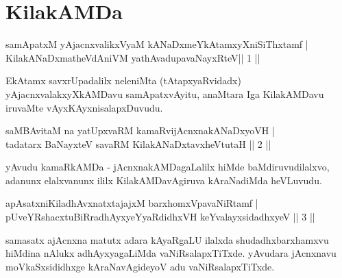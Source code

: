 
\chapter{KilakAMDa}

\begin{shl}
samApatxM yAjacnxvalikxVyaM kANaDxmeYkAtamxyXniSiThxtamf  | \\
KilakANaDxmatheVdAniVM yathAvadupavaNayxRteV\hfill ||  1 ||  
\end{shl}

\begin{artha}
EkAtamx savxrUpadalilx neleniMta (tAtapxyaRvidadx) yAjacnxvalakxyXkAMDavu samApatxvAyitu, anaMtara Iga KilakAMDavu iruvaMte vAyxKAyxnisalapxDuvudu.
\end{artha}


\begin{shl}
saMBAvitaM na yatUpxvaRM kamaRvijAcnxnakANaDxyoVH |  \\
tadatarx BaNayxteV savaRM KilakANaDxtavxheVtutaH \hfill||  2 ||  
\end{shl}

\begin{artha}
yAvudu kamaRkAMDa - jAcnxnakAMDagaLalilx hiMde baMdiruvudilalxvo, adanunx elalxvanunx ililx KilakAMDavAgiruva kAraNadiMda heVLuvudu.
\end{artha}


\begin{shl}
apAsatxniKiladhAvxnatxtajajxM barxhomxVpavaNiRtamf  | \\
pUveYRshacxtuBiRradhAyxyeYyaRdidhxVH keYvalayxsidadhxyeV \hfill ||  3 ||
\end{shl}

\begin{artha}
samasatx ajAcnxna matutx adara kAyaRgaLU ilalxda shudadhxbarxhamxvu hiMdina nAlukx adhAyxyagaLiMda vaNiRsalapxTiTxde. yAvudara jAcnxnavu moVkaSxsididhxge kAraNavAgideyoV adu vaNiRsalapxTiTxde.
\end{artha}


